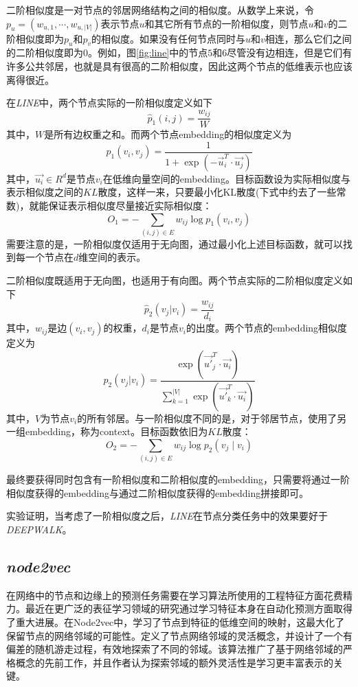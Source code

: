 二阶相似度是一对节点的邻居网络结构之间的相似度。从数学上来说，令$p_u=(w_{u, 1}, \cdots, w_{u,|V|})$表示节点$u$和其它所有节点的一阶相似度，则节点$u$和$v$的二阶相似度即为$p_u$和$p_v$的相似度。如果没有任何节点同时与$u$和$v$相连，那么它们之间的二阶相似度即为0。例如，图\ref{fig:line}中的节点$5$和$6$尽管没有边相连，但是它们有许多公共邻居，也就是具有很高的二阶相似度，因此这两个节点的低维表示也应该离得很近。

在\emph{LINE}中，两个节点实际的一阶相似度定义如下
\[\hat{p}_1(i, j) = \frac{w_{ij}}{W}\]
其中，$W$是所有边权重之和。而两个节点embedding的相似度定义为
\[p_1(v_i, v_j) = \frac{1}{1+ \exp(-\stackrel{\rightarrow}{u}_i^T\cdot \stackrel{\rightarrow}{u_j})}\]
其中，$\stackrel{\rightarrow}{u_i}\in R^d$是节点$v_i$在低维向量空间的embedding。目标函数设为实际相似度与表示相似度之间的$KL$散度，这样一来，只要最小化KL散度(下式中约去了一些常数)，就能保证表示相似度尽量接近实际相似度：
\[O_1 = -\sum_{(i, j)\in E}w_{ij}\log p_1(v_i, v_j)\]
需要注意的是，一阶相似度仅适用于无向图，通过最小化上述目标函数，就可以找到每一个节点在$d$维空间的表示。

二阶相似度既适用于无向图，也适用于有向图。两个节点实际的二阶相似度定义如下
\[\hat{p}_2(v_j|v_i) = \frac{w_{ij}}{d_i}\]
其中，$w_{ij}$是边$(v_i, v_j)$的权重，$d_i$是节点$v_i$的出度。两个节点的embedding相似度定义为
\[p_2(v_j|v_i) = \frac{\exp(\stackrel{\rightarrow}{u'}_j^T\cdot \stackrel{\rightarrow}{u_i})}{\sum_{k=1}^{|V|}\exp(\stackrel{\rightarrow}{u'}_k^T\cdot \stackrel{\rightarrow}{u_i})}\]
其中，$V$为节点$v_i$的所有邻居。与一阶相似度不同的是，对于邻居节点，使用了另一组embedding，称为context。目标函数依旧为$KL$散度：
\[O_2 = -\sum_{(i, j)\in E}w_{ij}\log p_2(v_j\mid v_i)\]

最终要获得同时包含有一阶相似度和二阶相似度的embedding，只需要将通过一阶相似度获得的embedding与通过二阶相似度获得的embedding拼接即可。

实验证明，当考虑了一阶相似度之后，\emph{LINE}在节点分类任务中的效果要好于\emph{DEEPWALK}。

\subsection{\emph{node2vec}}
在网络中的节点和边缘上的预测任务需要在学习算法所使用的工程特征方面花费精力。最近在更广泛的表征学习领域的研究通过学习特征本身在自动化预测方面取得了重大进展。在Node2vec中，学习了节点到特征的低维空间的映射，这最大化了保留节点的网络邻域的可能性。定义了节点网络邻域的灵活概念，并设计了一个有偏差的随机游走过程，有效地探索了不同的邻域。该算法推广了基于网络邻域的严格概念的先前工作，并且作者认为探索邻域的额外灵活性是学习更丰富表示的关键。



